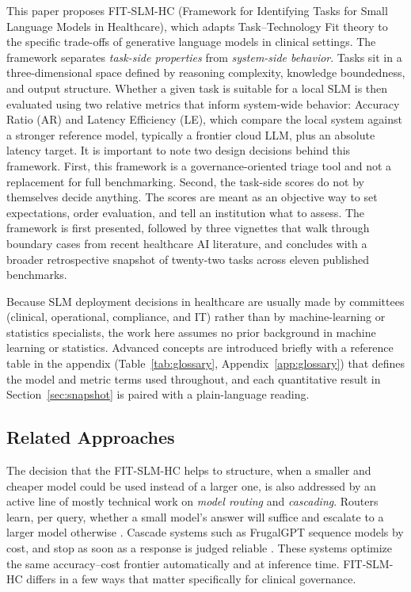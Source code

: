 \documentclass[11pt]{article}
\begin{document}
This paper proposes FIT-SLM-HC (Framework for Identifying Tasks for Small Language Models in Healthcare), which adapts Task--Technology Fit theory \cite{Goodhue1995, Zigurs1998} to the specific trade-offs of generative language models in clinical settings. The framework separates \emph{task-side properties} from \emph{system-side behavior}. Tasks sit in a three-dimensional space defined by reasoning complexity, knowledge boundedness, and output structure. Whether a given task is suitable for a local SLM is then evaluated using two relative metrics that inform system-wide behavior: Accuracy Ratio (AR) and Latency Efficiency (LE), which compare the local system against a stronger reference model, typically a frontier cloud LLM, plus an absolute latency target. It is important to note two design decisions behind this framework. First, this framework is a governance-oriented triage tool and not a replacement for full benchmarking. Second, the task-side scores do not by themselves decide anything. The scores are meant as an objective way to set expectations, order evaluation, and tell an institution what to assess. The framework is first presented, followed by three vignettes that walk through boundary cases from recent healthcare AI literature, and concludes with a broader retrospective snapshot of twenty-two tasks across eleven published benchmarks.

Because SLM deployment decisions in healthcare are usually made by committees (clinical, operational, compliance, and IT) rather than by machine-learning or statistics specialists, the work here assumes no prior background in machine learning or statistics. Advanced concepts are introduced briefly with a reference table in the appendix (Table~\ref{tab:glossary}, Appendix~\ref{app:glossary}) that defines the model and metric terms used throughout, and each quantitative result in Section~\ref{sec:snapshot} is paired with a plain-language reading.

\subsection{Related Approaches}
\label{sec:related}

The decision that the FIT-SLM-HC helps to structure, when a smaller and cheaper model could be used instead of a larger one, is also addressed by an active line of mostly technical work on \emph{model routing} and \emph{cascading}. Routers learn, per query, whether a small model's answer will suffice and escalate to a larger model otherwise \cite{Ong2025RouteLLM, Ding2024HybridLLM}. Cascade systems such as FrugalGPT sequence models by cost, and stop as soon as a response is judged reliable \cite{Chen2024FrugalGPT}. These systems optimize the same accuracy--cost frontier automatically and at inference time. FIT-SLM-HC differs in a few ways that matter specifically for clinical governance.
\end{document}
